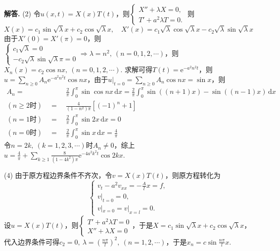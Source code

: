 \documentclass[12pt, a4paper, oneside]{ctexart}
\newenvironment{solution}[1][]{\par\noindent\textbf{#1解答. }}{\smallskip\par}  %
\let\geq=\geqslant %
\def\d{\mathrm{d}}          %
\def\e{\mathrm{e}}          %
\begin{document}
\begin{solution}
    (2) 令$u(x,t) = X(x)T(t)$，则$\begin{cases}
        X''+\lambda X = 0,\\
        T'+a^2\lambda T = 0.
    \end{cases}$
    则
    \begin{equation*}
        X(x) = c_1\sin\sqrt{\lambda}x+c_2\cos\sqrt{\lambda}x,\quad X'(x) = c_1\sqrt{\lambda}\cos\sqrt{\lambda}x-c_2\sqrt{\lambda}\sin\sqrt{\lambda}x
    \end{equation*}
    由于$X'(0) = X'(\pi) = 0$，则$\begin{cases}
        c_1\sqrt{\lambda} = 0\\
        -c_2\sqrt{\lambda}\sin\sqrt{\lambda}\pi = 0
    \end{cases}\Rightarrow\lambda = n^2,\ (n=0,1,2,\cdots)$，则$X_n(x) = c_2\cos nx,\ (n=0,1,2,\cdots)$. 求解可得$T(t) = \e^{-a^2n^2t}$，则$u = \sum_{n\geq 0}A_n\e^{-a^2n^2t}\cos nx$，由于$u|_{t=0} = \sum_{n\geq 0}A_n\cos nx = \sin x$，则
    \begin{align*}
        A_n=&\ \frac{2}{\pi}\int_0^{\pi}\sin\cos nx\,\d x = \frac{2}{\pi}\int_0^{\pi}\sin((n+1)x)-\sin((n-1)x)\,\d x\\
        (n\geq 2\text{时})\quad =&\ \frac{4}{(1-n^2)\pi}[(-1)^n+1]\\
        (n=1\text{时})\quad=&\ \frac{2}{\pi}\int_0^{\pi}\sin 2x\,\d x = 0\\
        (n=0\text{时})\quad=&\ \frac{2}{\pi}\int_0^{\pi}\sin x\,\d x = \frac{4}{\pi}
    \end{align*}
    令$n=2k,\ (k=1,2,3,\cdots)$时$A_n\neq 0$，综上$u = \frac{4}{\pi} + \sum_{k\geq 1}\frac{8}{(1-4k^2)\pi}\e^{-4a^2k^2t}\cos 2kx$.

    (4) 由于原方程边界条件不齐次，令$v = X(x)T(t)$，则原方程转化为
    \begin{equation*}
        \begin{cases}
            v_t-a^2v_{xx} = -\frac{A}{l}x = f,\\
            v|_{t=0} = 0,\\
            v|_{x=0} = v|_{x=l}=  0.
        \end{cases}
    \end{equation*}
    设$u = X(x)T(t)$，则$\begin{cases}
        T'+a^2\lambda T = 0\\
        X''+\lambda X = 0
    \end{cases}$，于是$X = c_1\sin\sqrt{\lambda}x+c_2\cos\sqrt{\lambda}x$，代入边界条件可得$c_2 = 0,\ \lambda = \left(\frac{n\pi}{l}\right)^2,\ (n=1,2,\cdots)$，于是$x_n = c\sin\frac{n\pi}{l}x$.


\end{solution}
\end{document}
